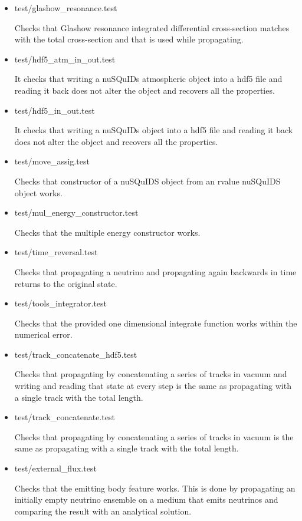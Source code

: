 \documentclass[3p,12pt]{elsarticle}
\newcommand{\ttf}{\ttfamily}
\begin{document}
\begin{itemize}
\item {\ttf test/glashow\_resonance.test}
  
  Checks that Glashow resonance integrated differential cross-section
  matches with the total cross-section and that is used while propagating. 
  
\item {\ttf test/hdf5\_atm\_in\_out.test}
  
  It checks that writing a nuSQuIDs atmospheric object into a hdf5 file and reading it
  back does not alter the object and recovers all the properties.

  
\item {\ttf test/hdf5\_in\_out.test}
  
  It checks that writing a nuSQuIDs object into a hdf5 file and reading it
  back does not alter the object and recovers all the properties.

\item {\ttf test/move\_assig.test}
  
  Checks that constructor of a nuSQuIDS object from an rvalue nuSQuIDS object works.
  
\item {\ttf test/mul\_energy\_constructor.test}
  
  Checks that the multiple energy constructor works.
  
\item {\ttf test/time\_reversal.test}
  
  Checks that propagating a neutrino and propagating again backwards
  in time returns to the original state.
  
\item {\ttf test/tools\_integrator.test}
  
  Checks that the provided one dimensional integrate function works
  within the numerical error.
  
\item {\ttf test/track\_concatenate\_hdf5.test}
  
  Checks that propagating by concatenating a series of tracks in
  vacuum and writing and reading that state at every step is the same
  as propagating with a single track with the total length. 
  
  
\item {\ttf test/track\_concatenate.test}
  
  Checks that propagating by concatenating a series of tracks in
  vacuum is the same as propagating with a single track with the total length. 
  
\item {\ttf test/external\_flux.test}
  
  Checks that the emitting body feature works. This is done by propagating 
  an initially empty neutrino ensemble on a medium that emits neutrinos and comparing the 
  result with an analytical solution.

\end{itemize}


\fi %

\ifdefined\manualonly


\fi
\end{document}
